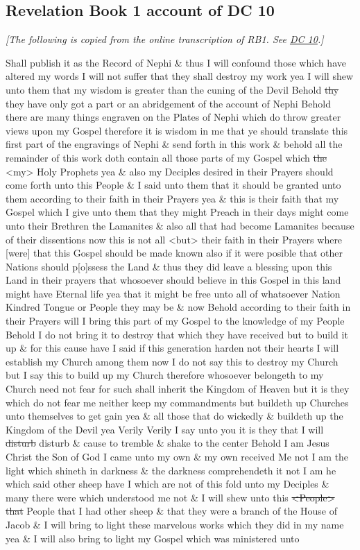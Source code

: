 	\subsection{Revelation Book 1 account of DC 10}
		\label{EXSS-DC10-RB1}
		
		\textit{[The following is copied from the online transcription of RB1. See \hyperref[DC10]{DC 10}.]}
		
		Shall publish it as the Record of Nephi \& thus I will confound those which have altered my words I will not suffer that they shall destroy my work yea I will shew unto them that my wisdom is greater than the cuning of the Devil Behold \sout{thy} they have only got a part or an abridgement of the account of Nephi Behold there are many things engraven on the Plates of Nephi which do throw greater views upon my Gospel therefore it is wisdom in me that ye should translate this first part of the engravings of Nephi \& send forth in this work \& behold all the remainder of this work doth contain all those parts of my Gospel which \sout{the} <my> Holy Prophets yea \& also my Deciples desired in their Prayers should come forth unto this People \& I said unto them that it should be granted unto them according to their faith in their Prayers yea \& this is their faith that my Gospel which I give unto them that they might Preach in their days might come unto their Brethren the Lamanites \& also all that had become Lamanites because of their dissentions now this is not all <but> their faith in their Prayers where [were] that this Gospel should be made known also if it were posible that other Nations should p[o]ssess the Land \& thus they did leave a blessing upon this Land in their prayers that whosoever should believe in this Gospel in this land might have Eternal life yea that it might be free unto all of whatsoever Nation Kindred Tongue or People they may be \& now Behold according to their faith in their Prayers will I bring this part of my Gospel to the knowledge of my People Behold I do not bring it to destroy that which they have received but to build it up \& for this cause have I said if this generation harden not their hearts I will establish my Church among them now I do not say this to destroy my Church but I say this to build up my Church therefore whosoever belongeth to my Church need not fear for such shall inherit the Kingdom of Heaven but it is they which do not fear me neither keep my commandments but buildeth up Churches unto themselves to get gain yea \& all those that do wickedly \& buildeth up the Kingdom of the Devil yea Verily Verily I say unto you it is they that I will \sout{disturb} disturb \& cause to tremble \& shake to the center Behold I am Jesus Christ the Son of God I came unto my own \& my own received Me not I am the light which shineth in darkness \& the darkness comprehendeth it not I am he which said other sheep have I which are not of this fold unto my Deciples \& many there were which understood me not \& I will shew unto this \sout{<People>} \sout{that} People that I had other sheep \& that they were a branch of the House of Jacob \& I will bring to light these marvelous works which they did in my name yea \& I will also bring to light my Gospel which was ministered unto 